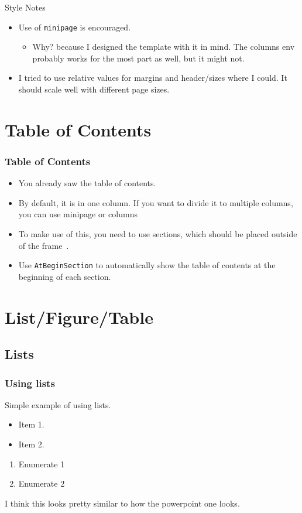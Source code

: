\documentclass[
	10pt, %
	aspectratio=169, %
]{beamer}
\begin{document}
\begin{frame}{Style Notes}
	\begin{itemize}
		\item Use of \texttt{minipage} is encouraged.
		      \begin{itemize}
			      \item Why? because I designed the template with it in mind. The columns env probably works for the most part as well, but it might not.
		      \end{itemize}
		\item I tried to use relative values for margins and header/sizes where I could. It should scale well with different page sizes.
	\end{itemize}
\end{frame}


\section{Table of Contents}
\begin{frame}
	\frametitle{Table of Contents}
	\begin{itemize}
		\item You already saw the table of contents.
		\item By default, it is in one column. If you want to divide it to multiple columns, you can use minipage or columns~\cite{samcarter_is_at_topanswers.xyzAnswerBeamerVertical2013}
		\item To make use of this, you need to use sections, which should be placed outside of the frame~\cite{campaAnswerAtbeginsectionReturns2022}.
		\item Use \texttt{AtBeginSection} to automatically show the table of contents at the beginning of each section.
	\end{itemize}
\end{frame}


\section{List/Figure/Table}
\subsection{Lists}
\begin{frame}
	\frametitle{Using lists}
	Simple example of using lists.
	\begin{itemize}
		\item Item 1.
		\item Item 2.
	\end{itemize}

	\begin{enumerate}
		\setlength{\leftmargini}{12pt}
		\item Enumerate 1
		\item Enumerate 2
	\end{enumerate}
	I think this looks pretty similar to how the powerpoint one looks.
\end{frame}
\end{document}
